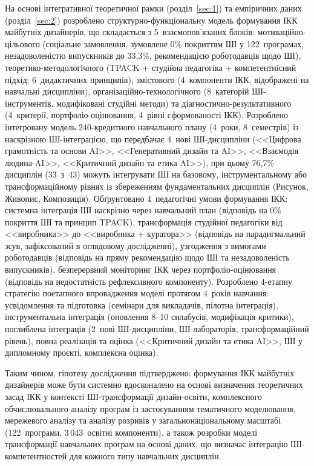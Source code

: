 \begin{enumerate}
На основі інтегративної теоретичної рамки (розділ~\ref{sec:1}) та емпіричних даних (розділ~\ref{sec:2}) розроблено структурно-функціональну модель формування ІКК майбутніх дизайнерів, що складається з 5~взаємопов'язаних блоків: мотиваційно-цільового (соціальне замовлення, зумовлене 0\% покриттям ШІ у 122~програмах, незадоволеністю випускників до 33,3\%, рекомендацією роботодавців щодо ШІ), теоретико-методологічного (TPACK + студійна педагогіка + компетентнісний підхід; 6~дидактичних принципів), змістового (4~компоненти ІКК, відображені на навчальні дисципліни), організаційно-технологічного (8~категорій ШІ-інструментів, модифіковані студійні методи) та діагностично-результативного (4~критерії, портфоліо-оцінювання, 4~рівні сформованості ІКК). Розроблено інтегровану модель 240-кредитного навчального плану (4~роки, 8~семестрів) із наскрізною ШІ-інтеграцією, що передбачає 4~нові ШІ-дисципліни (<<Цифрова грамотність та основи AI>>, <<Генеративний дизайн та AI>>, <<Взаємодія людина-AI>>, <<Критичний дизайн та етика AI>>), при цьому 76,7\% дисциплін (33~з~43) можуть інтегрувати ШІ на базовому, інструментальному або трансформаційному рівнях із збереженням фундаментальних дисциплін (Рисунок, Живопис, Композиція). Обґрунтовано 4~педагогічні умови формування ІКК: системна інтеграція ШІ наскрізно через навчальний план (відповідь на 0\% покриття ШІ та принцип TPACK), трансформація студійної педагогіки від <<виробника>> до <<виробника + куратора>> (відповідь на парадигмальний зсув, зафіксований в оглядовому дослідженні), узгодження з вимогами роботодавців (відповідь на пряму рекомендацію щодо ШІ та незадоволеність випускників), безперервний моніторинг ІКК через портфоліо-оцінювання (відповідь на недостатність рефлексивного компоненту). Розроблено 4-етапну стратегію поетапного впровадження моделі протягом 4~років навчання: усвідомлення та підготовка (семінари для викладачів, пілотна інтеграція), інструментальна інтеграція (оновлення 8--10 силабусів, модифікація критики), поглиблена інтеграція (2~нові ШІ-дисципліни, ШІ-лабораторія, трансформаційний рівень), повна реалізація та оцінка (<<Критичний дизайн та етика AI>>, ШІ у дипломному проєкті, комплексна оцінка).

\end{enumerate}

Таким чином, гіпотезу дослідження підтверджено: формування ІКК майбутніх дизайнерів може бути системно вдосконалено на основі визначення теоретичних засад ІКК у контексті ШІ-трансформації дизайн-освіти, комплексного обчислювального аналізу програм із застосуванням тематичного моделювання, мережевого аналізу та аналізу розривів у загальнонаціональному масштабі (122~програми, 3\,043~освітні компоненти), а також розробки моделі трансформації навчальних програм на основі даних, що визначає інтеграцію ШІ-компетентностей для кожного типу навчальних дисциплін.

